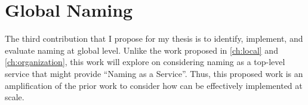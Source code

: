 \chapter{Global Naming}
\label{ch:global}

The third contribution that I propose for my thesis is to identify,
implement, and evaluate naming at global level. Unlike the work proposed in
\autoref{ch:local} and \autoref{ch:organization}, this work will explore on
considering naming as a top-level service that might provide ``Naming as a
Service''. Thus, this proposed work is an amplification of the prior work to
consider how \system can be effectively implemented at scale.

